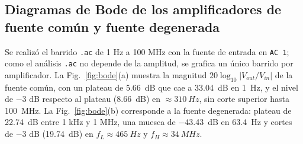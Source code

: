 \documentclass[conference]{IEEEtran}
\begin{document}
\subsection{Diagramas de Bode de los amplificadores de fuente común y fuente degenerada}
\label{sec:bode}
Se realizó el barrido \texttt{.ac} de 1 Hz a 100 MHz con la fuente de entrada en \texttt{AC 1}; como el análisis \texttt{.ac} no depende de la amplitud, se grafica un único barrido por amplificador. La Fig.~\ref{fig:bode}(a) muestra la magnitud $20\log_{10}|V_{out}/V_{in}|$ de la fuente común, con un plateau de \SI{5.66}{dB} que cae a \SI{33.04}{dB} en \SI{1}{Hz}, y el nivel de $-3$ dB respecto al plateau (\SI{8.66}{dB}) en $\approx\SI{310}{Hz}$, sin corte superior hasta \SI{100}{MHz}. La Fig.~\ref{fig:bode}(b) corresponde a la fuente degenerada: plateau de \SI{22.74}{dB} entre 1 kHz y 1 MHz, una muesca de \SI{-43.43}{dB} en \SI{63.4}{Hz} y cortes de $-3$ dB (\SI{19.74}{dB}) en $f_L\approx\SI{465}{Hz}$ y $f_H\approx\SI{34}{MHz}$.
\end{document}
